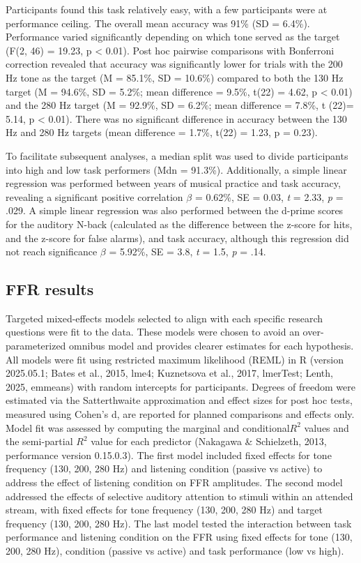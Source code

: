 Participants found this task relatively easy, with a few participants were at performance ceiling. The overall mean accuracy was 91\% (SD = 6.4\%). Performance varied significantly depending on which tone served as the target (F(2, 46) = 19.23, p < 0.01). Post hoc pairwise comparisons with Bonferroni correction revealed that accuracy was significantly lower for trials with the 200 Hz tone as the target (M = 85.1\%, SD = 10.6\%) compared to both the 130 Hz target (M = 94.6\%, SD = 5.2\%; mean difference = 9.5\%, t(22) = 4.62, p < 0.01) and the 280 Hz target (M = 92.9\%, SD = 6.2\%; mean difference = 7.8\%, t (22)= 5.14, p < 0.01). There was no significant difference in accuracy between the 130 Hz and 280 Hz targets (mean difference = 1.7\%, t(22) = 1.23, p = 0.23). 

To facilitate subsequent analyses, a median split was used to divide participants into high and low task performers (Mdn = 91.3\%). Additionally, a simple linear regression was performed between years of musical practice and task accuracy, revealing a significant positive correlation  $\beta$ = 0.62\%, SE  = 0.03, \textit{t} = 2.33, \textit{p} = .029. A simple linear regression was also performed between the d-prime scores for the auditory N-back (calculated as the difference between the z-score for hits, and the z-score for false alarms), and task accuracy, although this regression did not reach significance $\beta$ = 5.92\%, SE  = 3.8, \textit{t} = 1.5, \textit{p} = .14.


\subsection*{FFR results}
Targeted mixed-effects models selected to align with each specific research questions were fit to the data. These models were chosen to avoid an over-parameterized omnibus model and provides clearer estimates for each hypothesis. All models were fit using restricted maximum likelihood (REML) in R (version 2025.05.1; Bates et al., 2015, lme4; Kuznetsova et al., 2017, lmerTest; Lenth, 2025, emmeans) with random intercepts for participants. Degrees of freedom were estimated via the Satterthwaite approximation and effect sizes for post hoc tests, measured using Cohen’s d, are reported for planned comparisons and effects only. Model fit was assessed by computing the marginal and conditional$R^2$ values and the semi-partial $R^2$ value for each predictor (Nakagawa \& Schielzeth, 2013, performance version 0.15.0.3). The first model included fixed effects for tone frequency (130, 200, 280 Hz) and listening condition (passive vs active) to address the effect of listening condition on FFR amplitudes. The second model addressed the effects of selective auditory attention to stimuli within an attended stream, with fixed effects for tone frequency (130, 200, 280 Hz) and target frequency (130, 200, 280 Hz). The last model tested the interaction between task performance and listening condition on the FFR using fixed effects for tone (130, 200, 280 Hz), condition (passive vs active) and task performance (low vs high). 

